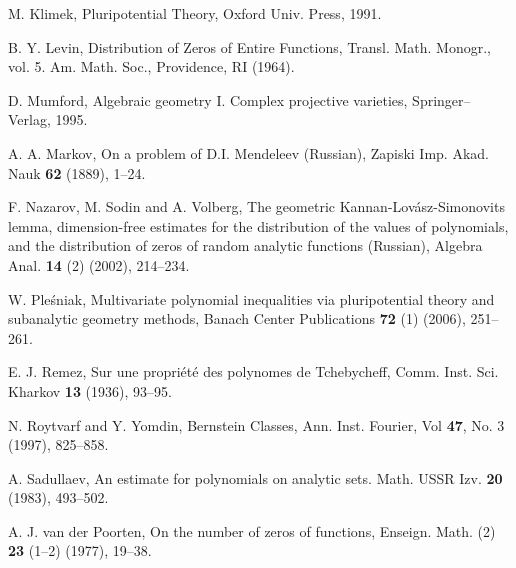 \documentclass[11pt, oneside]{amsart}
\begin{document}
\begin{thebibliography}{}
M. Klimek, Pluripotential Theory, Oxford Univ. Press, 1991.

B. Y. Levin,  Distribution of Zeros of Entire Functions, Transl. Math. Monogr., vol. 5. Am. Math. Soc., Providence, RI (1964).

D. Mumford, Algebraic geometry I. Complex projective varieties, Springer--Verlag, 1995.

A. A. Markov, On a problem of D.I. Mendeleev (Russian), Zapiski Imp. Akad.
Nauk {\bf 62} (1889), 1--24.

F. Nazarov, M. Sodin and A. Volberg, The geometric Kannan-Lov\'asz-Simonovits lemma, dimension-free estimates for the distribution of the values of polynomials, and the distribution of zeros of random analytic functions (Russian), Algebra Anal. {\bf 14} (2) (2002), 214--234.

W. Ple\'sniak, Multivariate polynomial inequalities via pluripotential theory and subanalytic geometry methods, Banach Center Publications {\bf 72} (1) (2006),
251--261.

E. J. Remez, Sur une propri\'et\'e des polynomes de Tchebycheff, Comm. Inst. Sci. Kharkov {\bf 13} (1936), 93--95.

N. Roytvarf and Y. Yomdin, Bernstein Classes, Ann. Inst.
Fourier, Vol {\bf 47}, No. 3 (1997), 825--858.

A. Sadullaev, An estimate for polynomials on analytic sets. Math. USSR Izv. {\bf 20} (1983), 493--502.

A. J. van der Poorten, On the number of zeros of functions, Enseign. Math. (2)
{\bf 23} (1--2) (1977), 19--38.

\end{thebibliography}
\end{document}
